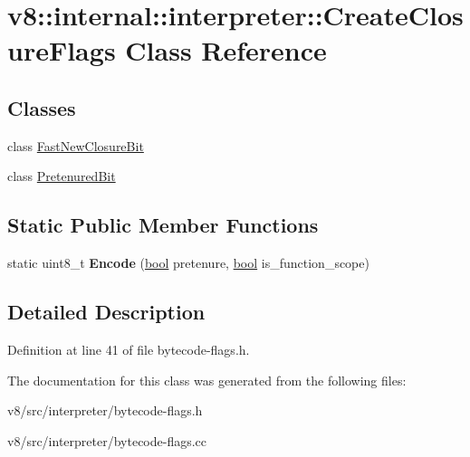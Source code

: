 \hypertarget{classv8_1_1internal_1_1interpreter_1_1CreateClosureFlags}{}\section{v8\+:\+:internal\+:\+:interpreter\+:\+:Create\+Closure\+Flags Class Reference}
\label{classv8_1_1internal_1_1interpreter_1_1CreateClosureFlags}
\subsection*{Classes}
\begin{DoxyCompactItemize}
\item 
class \mbox{\hyperlink{classv8_1_1internal_1_1interpreter_1_1CreateClosureFlags_1_1FastNewClosureBit}{Fast\+New\+Closure\+Bit}}
\item 
class \mbox{\hyperlink{classv8_1_1internal_1_1interpreter_1_1CreateClosureFlags_1_1PretenuredBit}{Pretenured\+Bit}}
\end{DoxyCompactItemize}
\subsection*{Static Public Member Functions}
\begin{DoxyCompactItemize}
\item 
\mbox{\label{classv8_1_1internal_1_1interpreter_1_1CreateClosureFlags_ab8998a36938be014d7b3b8d878f244f7}} 
static uint8\+\_\+t {\bfseries Encode} (\mbox{\hyperlink{classbool}{bool}} pretenure, \mbox{\hyperlink{classbool}{bool}} is\+\_\+function\+\_\+scope)
\end{DoxyCompactItemize}


\subsection{Detailed Description}


Definition at line 41 of file bytecode-\/flags.\+h.



The documentation for this class was generated from the following files\+:\begin{DoxyCompactItemize}
\item 
v8/src/interpreter/bytecode-\/flags.\+h\item 
v8/src/interpreter/bytecode-\/flags.\+cc\end{DoxyCompactItemize}

